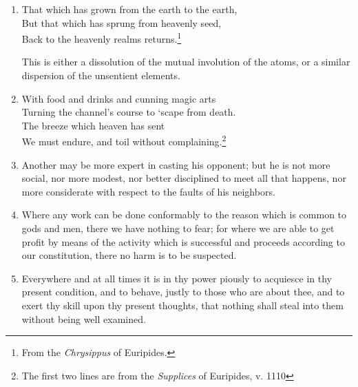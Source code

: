\begin{enumerate}
\item

\par

\begin{displayquote}
 \hspace{-1.9em}
That which has grown from the earth to the earth, \\
But that which has sprung from heavenly seed, \\
Back to the heavenly realms returns.\footnote{From the \textit{Chrysippus} of Euripides.}
\end{displayquote}

This is either a dissolution of the mutual involution of the atoms, or a similar dispersion of the unsentient elements.

\item

\par

\begin{displayquote}
\hspace{-1.9em}
With food and drinks and cunning magic arts \\
Turning the channel's course to `scape from death. \\
The breeze which heaven has sent \\
We must endure, and toil without complaining.\footnote{The first two lines are from the \textit{Supplices} of Euripides, v. 1110}
\end{displayquote}

\item Another may be more expert in casting his opponent; but he is not more social, nor more modest, nor better disciplined to meet all that happens, nor more considerate with respect to the faults of his neighbors.

\item Where any work can be done conformably to the reason which is common to gods and men, there we have nothing to fear; for where we are able to get profit by means of the activity which is successful and proceeds according to our constitution, there no harm is to be suspected.

\item Everywhere and at all times it is in thy power piously to acquiesce in thy present condition, and to behave, justly to those who are about thee, and to exert thy skill upon thy present thoughts, that nothing shall steal into them without being well examined.


\end{enumerate}
